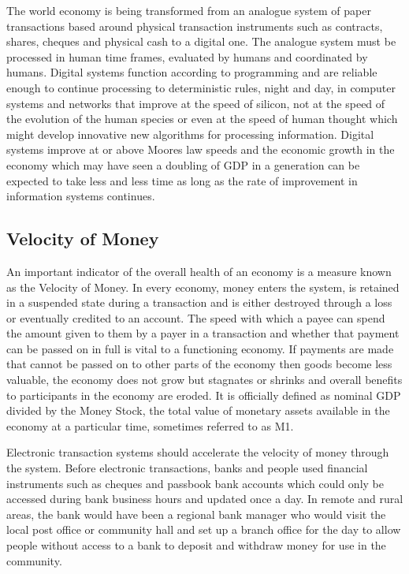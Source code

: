 The world economy is being transformed from an analogue system of paper transactions based around physical transaction instruments such as contracts, shares, cheques and physical cash to a digital one. The analogue system must be processed in human time frames, evaluated by humans and coordinated by humans. Digital systems function according to programming and are reliable enough to continue processing to deterministic rules, night and day, in computer systems and networks that improve at the speed of silicon, not at the speed of the evolution of the human species or even at the speed of human thought which might develop innovative new algorithms for processing information. Digital systems improve at or above Moores law speeds and the economic growth in the economy which may have seen a doubling of GDP in a generation can be expected to take less and less time as long as the rate of improvement in information systems continues.

\subsection{Velocity of Money}
An important indicator of the overall health of an economy is a measure known as the Velocity of Money. In every economy, money enters the system, is retained in a suspended state during a transaction and is either destroyed through a loss or eventually credited to an account. The speed with which a payee can spend the amount given to them by a payer in a transaction and whether that payment can be passed on in full is vital to a functioning economy. If payments are made that cannot be passed on to other parts of the economy then goods become less valuable, the economy does not grow but stagnates or shrinks and overall benefits to participants in the economy are eroded. It is officially defined as  nominal GDP divided by the Money Stock, the total value of monetary assets available in the economy at a particular time\cite{John2018}, sometimes referred to as M1.

Electronic transaction systems should accelerate the velocity of money through the system. Before electronic transactions, banks and people used financial instruments such as cheques and passbook bank accounts which could only be accessed during bank business hours and updated once a day. In remote and rural areas, the bank would have been a regional bank manager who would visit the local post office or community hall and set up a branch office for the day to allow people without access to a bank to deposit and withdraw money for use in the community.

